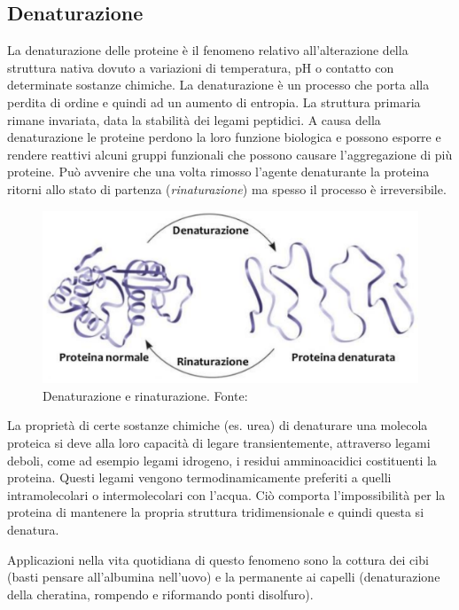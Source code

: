 \subsection{Denaturazione} \label{sec:denaturazione}
La denaturazione delle proteine è il fenomeno relativo all'alterazione della struttura nativa dovuto a variazioni di temperatura, pH o contatto con determinate sostanze chimiche. La denaturazione è un processo che porta alla perdita di ordine e quindi ad un aumento di entropia. La struttura primaria rimane invariata, data la stabilità dei legami peptidici. A causa della denaturazione le proteine perdono la loro funzione biologica e possono esporre e rendere reattivi alcuni gruppi funzionali che possono causare l'aggregazione di più proteine. Può avvenire che una volta rimosso l’agente denaturante la proteina ritorni allo stato di partenza (\textit{rinaturazione}) ma spesso il processo è irreversibile.

\begin{figure}[h]
	\centering
	\includegraphics[scale=0.3]{images/denaturazione-rina.png}
	\caption{Denaturazione e rinaturazione. Fonte: \cite{campbell}}
	\label{fig:denaturazione}
\end{figure}

\par La proprietà di certe sostanze chimiche (es. urea) di denaturare una molecola proteica si deve alla loro capacità di legare transientemente, attraverso legami deboli, come ad esempio legami idrogeno, i residui amminoacidici costituenti la proteina. Questi legami vengono termodinamicamente preferiti a quelli intramolecolari o intermolecolari con l'acqua. Ciò comporta l'impossibilità per la proteina di mantenere la propria struttura tridimensionale e quindi questa si denatura. 

\par Applicazioni nella vita quotidiana di questo fenomeno sono la cottura dei cibi (basti pensare all'albumina nell'uovo) e la permanente ai capelli (denaturazione della cheratina, rompendo e riformando ponti disolfuro). 


